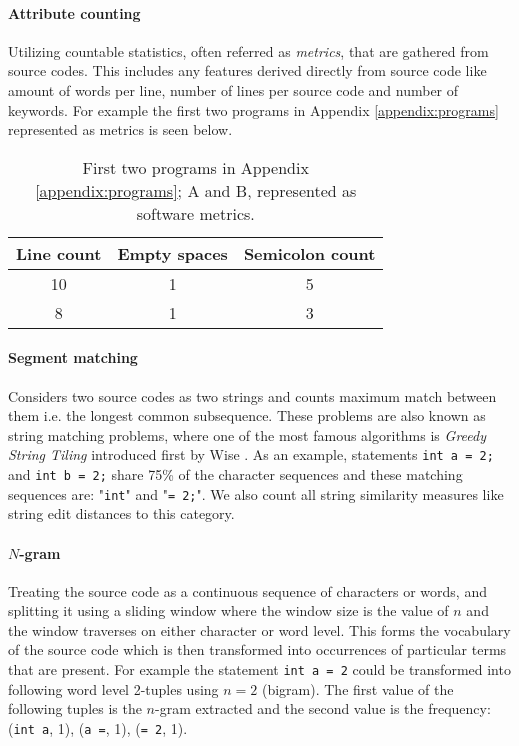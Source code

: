 \paragraph{Attribute counting}
Utilizing countable statistics, often referred as \emph{metrics}, that are gathered from source codes. This includes any features derived directly from source code like amount of words per line, number of lines per source code and number of keywords. For example the first two programs in Appendix \ref{appendix:programs} represented as metrics is seen below.

\begin{table}[ht]
    \centering
    \begin{tabular}{|c|c|c|} \hline
        \textbf{Line count} & \textbf{Empty spaces} & \textbf{Semicolon count}\\ \hline
         10 & 1 & 5 \\ \hline
         8 & 1 & 3\\ \hline
    \end{tabular}
    \caption{First two programs in Appendix \ref{appendix:programs}; A and B, represented as software metrics.}
    \label{tab:my_label}
\end{table}

\paragraph{Segment matching}
Considers two source codes as two strings and counts maximum match between them i.e. the longest common subsequence. These problems are also known as string matching problems, where one of the most famous algorithms is \emph{Greedy String Tiling} introduced first by Wise \cite{SSGST1993}. As an example, statements \texttt{int a = 2;} and \texttt{int b = 2;} share 75\% of the character sequences and these matching sequences are: "\texttt{int}" and "\texttt{= 2;}". We also count all string similarity measures like string edit distances  to this category.

\paragraph{$N$-gram}
Treating the source code as a continuous sequence of characters or words, and splitting it using a sliding window where the window size is the value of $n$ and the window traverses on either character or word level. This forms the vocabulary of the source code which is then transformed into occurrences of particular terms that are present. For example the statement \texttt{int a = 2} could be transformed into following word level 2-tuples using $n = 2$ (bigram). The first value of the following tuples is the $n$-gram extracted and the second value is the frequency: (\texttt{int a}, 1), (\texttt{a =}, 1), (\texttt{= 2}, 1). 


